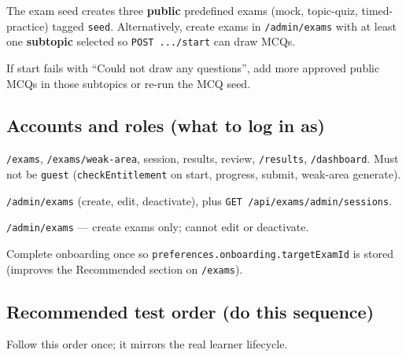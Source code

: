 \documentclass[11pt,a4paper]{article}
\begin{document}
The exam seed creates three \textbf{public} predefined exams (mock, topic-quiz, timed-practice) tagged \texttt{seed}. Alternatively, create exams in \texttt{/admin/exams} with at least one \textbf{subtopic} selected so \texttt{POST .../start} can draw MCQs.

If start fails with ``Could not draw any questions'', add more approved public MCQs in those subtopics or re-run the MCQ seed.

\subsection{Accounts and roles (what to log in as)}

\begin{description}[style=nextline]
  \item[Student / mentor / etc.] \texttt{/exams}, \texttt{/exams/weak-area}, session, results, review, \texttt{/results}, \texttt{/dashboard}. Must not be \texttt{guest} (\texttt{checkEntitlement} on start, progress, submit, weak-area generate).
  \item[\texttt{admin} or \texttt{superAdmin}] \texttt{/admin/exams} (create, edit, deactivate), plus \texttt{GET /api/exams/admin/sessions}.
  \item[\texttt{contentManager}] \texttt{/admin/exams} --- create exams only; cannot edit or deactivate.
\end{description}

Complete onboarding once so \texttt{preferences.onboarding.targetExamId} is stored (improves the Recommended section on \texttt{/exams}).

\subsection{Recommended test order (do this sequence)}

Follow this order once; it mirrors the real learner lifecycle.
\end{document}
